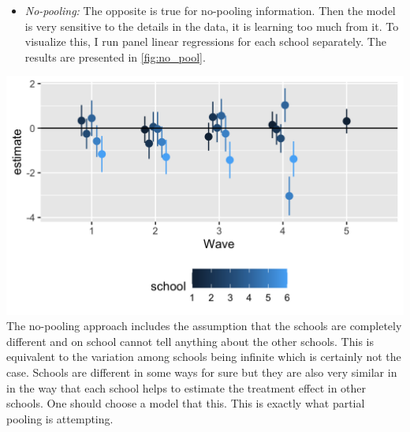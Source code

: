 \documentclass[a4, 12pt]{article}
\providecommand{\tightlist}{%
  \setlength{\itemsep}{0pt}\setlength{\parskip}{0pt}}
\begin{document}
\begin{itemize}
\tightlist
\item
  \emph{No-pooling:}
  The opposite is true for no-pooling information. Then the model is very sensitive to the details in the data, it is learning too much from it. To visualize this, I run panel linear regressions for each school separately. The results are presented in \ref{fig:no_pool}.
\end{itemize}

\includegraphics[width=1\linewidth]{../figures/no_pool}
The no-pooling approach includes the assumption that the schools are completely different and on school cannot tell anything about the other schools. This is equivalent to the variation among schools being infinite which is certainly not the case. Schools are different in some ways for sure but they are also very similar in in the way that each school helps to estimate the treatment effect in other schools. One should choose a model that this. This is exactly what partial pooling is attempting.
\end{document}
